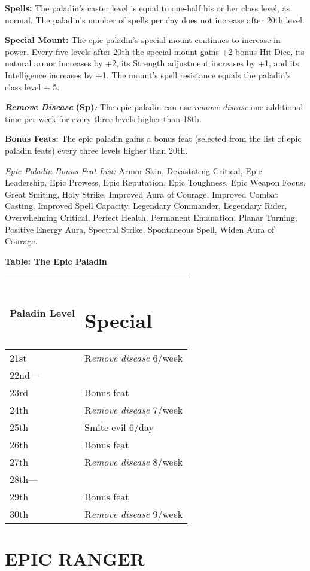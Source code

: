 \documentclass{article}
\begin{document}
\textbf{Spells:} The paladin's caster level is equal to one-half his or her class 
level, as normal.  The paladin's number of spells per day does not increase after 
20th level. 

\textbf{Special Mount:} The epic paladin's special mount continues to increase 
in power. Every five levels after 20th the special mount gains +2 bonus Hit Dice, 
its natural armor increases by +2, its Strength adjustment increases by +1, and 
its Intelligence increases by +1. The mount's spell resistance equals the paladin's 
class level + 5. 

\textit{\textbf{Remove Disease}}\textbf{ (Sp)}\textit{\textbf{: }}The epic paladin 
can use \textit{remove disease }one additional time per week for every three levels 
higher than 18th. 

\textbf{Bonus Feats:} The epic paladin gains a bonus feat (selected from the list 
of epic paladin feats) every three levels higher than 20th. 

\textit{Epic Paladin Bonus Feat List: }Armor Skin, Devastating Critical, Epic Leadership, 
Epic Prowess, Epic Reputation, Epic Toughness, Epic Weapon Focus, Great Smiting, 
Holy Strike, Improved Aura of Courage, Improved Combat Casting, Improved Spell 
Capacity, Legendary Commander, Legendary Rider, Overwhelming Critical, Perfect 
Health, Permanent Emanation, Planar Turning, Positive Energy Aura, Spectral Strike, 
Spontaneous Spell, Widen Aura of Courage. 

\textbf{Table: The Epic Paladin }

\begin{tabular}{|>{\raggedright}p{38pt}|>{\raggedright}p{123pt}|}
\hline
P\textbf{aladin Level} & \section*{S\textbf{pecial }}\tabularnewline
\hline
21st & R\textit{emove disease }6/week \tabularnewline
\hline
22nd--- &  \tabularnewline
\hline
23rd & Bonus feat \tabularnewline
\hline
24th & R\textit{emove disease }7/week \tabularnewline
\hline
25th & Smite evil 6/day\tabularnewline
\hline
26th & Bonus feat\tabularnewline
\hline
27th & R\textit{emove disease }8/week \tabularnewline
\hline
28th--- &  \tabularnewline
\hline
29th & Bonus feat \tabularnewline
\hline
30th & R\textit{emove disease }9/week \tabularnewline
\hline
\end{tabular}

\vspace{24pt}
\section*{{\LARGE{}EPIC RANGER }}
\end{document}
